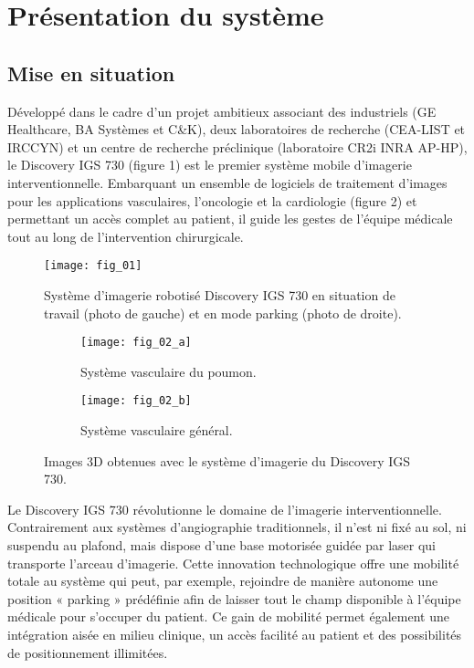 
\section{Présentation du système}
\subsection{Mise en situation}
Développé dans le cadre d’un projet ambitieux associant des industriels (GE Healthcare, BA Systèmes et C\&K), deux laboratoires de recherche (CEA-LIST et IRCCYN) et un centre de recherche
préclinique (laboratoire CR2i INRA AP-HP), le Discovery IGS 730 (figure 1) est le premier système
mobile d’imagerie interventionnelle. Embarquant un ensemble de logiciels de traitement d’images
pour les applications vasculaires, l’oncologie et la cardiologie (figure 2) et permettant un accès complet au patient, il guide les gestes de l’équipe médicale tout au long de l’intervention chirurgicale.

\begin{figure}[!h]
\centering
\texttt{[image: fig\_01]}
\caption{\label{fig:01}  Système d’imagerie robotisé Discovery IGS 730 en situation de travail (photo de gauche) et en mode parking (photo de droite).}
\end{figure}


\begin{figure}[!h]
\centering
	\begin{subfigure}[b]{0.3\textwidth}
	\centering
	\texttt{[image: fig\_02\_a]}
	\caption{\label{fig:02a} Système vasculaire du poumon.}	
	\end{subfigure}
	\begin{subfigure}[b]{0.3\textwidth}
	\centering
	\texttt{[image: fig\_02\_b]}
	\caption{\label{fig:02b} Système vasculaire général.}
	\end{subfigure}


\caption{\label{fig:02}  Images 3D obtenues avec le système d’imagerie du Discovery IGS 730.}
\end{figure}

Le Discovery IGS 730 révolutionne le domaine de l’imagerie interventionnelle. Contrairement aux
systèmes d’angiographie traditionnels, il n’est ni fixé au sol, ni suspendu au plafond, mais dispose
d’une base motorisée guidée par laser qui transporte l’arceau d’imagerie. Cette innovation technologique offre une mobilité totale au système qui peut, par exemple, rejoindre de manière autonome
une position « parking » prédéfinie afin de laisser tout le champ disponible à l’équipe médicale pour
s’occuper du patient. Ce gain de mobilité permet également une intégration aisée en milieu clinique,
un accès facilité au patient et des possibilités de positionnement illimitées.


